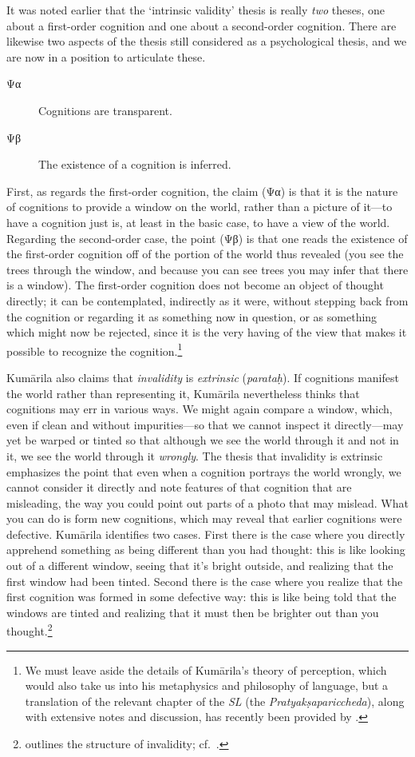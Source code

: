 \documentclass[11pt,letterpaper,oneside]{amsart}
\newcommand{\g}{\textgreek}
\newcommand{\e}{\emph}
\begin{document}
It was noted earlier that the `intrinsic validity' thesis is really \emph{two} theses, one about a first-order cognition and one about a second-order cognition. There are likewise two aspects of the thesis still considered as a psychological thesis, and we are now in a position to articulate these.\begin{description}
\item[\g{Ψα}] Cognitions are transparent.
\item[\g{Ψβ}] The existence of a cognition is inferred.\end{description} First, as regards the first-order cognition, the claim (\g{Ψα}) is that it is the nature of cognitions to provide a window on the world, rather than a picture of it---to have a cognition just is, at least in the basic case, to have a view of the world.  Regarding the second-order case, the point (\g{Ψβ}) is that one reads the existence of the first-order cognition off of the portion of the world thus revealed (you see the trees through the window, and because you can see trees you may infer that there is a window). The first-order cognition does not become an object of thought directly; it can be contemplated, indirectly as it were, without stepping back from the cognition or regarding it as something now in question, or as something which might now be rejected, since it is the very having of the view that makes it possible to recognize the cognition.\footnote{We must leave aside the details of Kum\=arila's theory of perception, which would also take us into his metaphysics and philosophy of language, but a translation of the relevant chapter of the \emph{SL} (the \emph{Pratyak\d sapariccheda}), along with extensive notes and discussion, has recently been provided by \citet{taber2005hindu}.}

Kum\=arila also claims that \e{invalidity} is \e{extrinsic} (\e{parata\d{h}}). If cognitions manifest the world rather than representing it, Kum\=arila nevertheless thinks that cognitions may err in various ways. We might again compare a window, which, even if clean and without impurities---so that we cannot inspect it directly---may yet be warped or tinted so that although we see the world through it and not in it, we see the world through it \emph{wrongly}. The thesis that invalidity is extrinsic emphasizes the point that even when a cognition portrays the world wrongly, we cannot consider it directly and note features of that cognition that are misleading, the way you could point out parts of a photo that may mislead. What you can do is form new cognitions, which may reveal that earlier cognitions were defective. Kum\=arila identifies two cases. First there is the case where you directly apprehend something as being different than you had thought: this is like looking out of a different window, seeing that it's bright outside, and realizing that the first window had been tinted. Second there is the case where you realize that the first cognition was formed in some defective way: this is like being told that the windows are tinted and realizing that it must then be brighter out than you thought.\footnote{\citet{kataoka2002validity} outlines the structure of invalidity; cf.\ \citet[p.\ 132]{bhatt1962epistemology}.}
\end{document}
